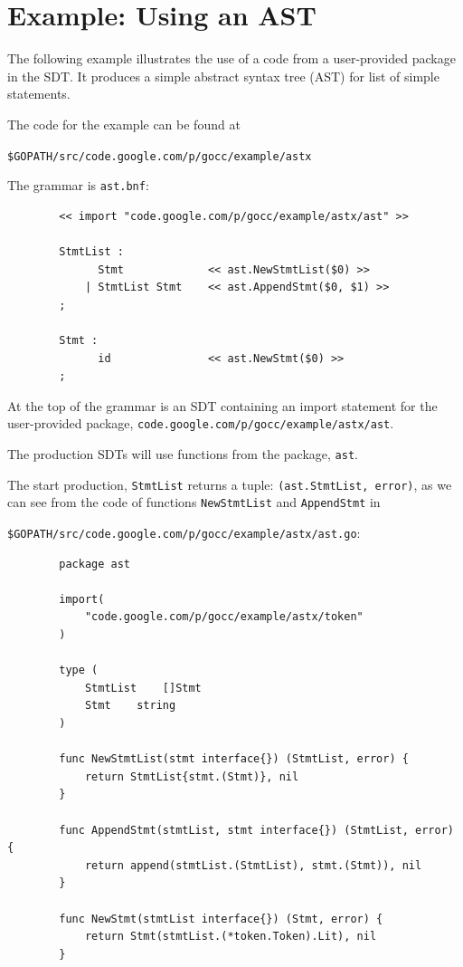 \documentclass[12pt]{article}
\begin{document}
\section{Example: Using an AST} \label{sec:example ast}
	The following example illustrates the use of a code from a user-provided package in the SDT. It produces a simple abstract syntax tree (AST) for list of simple statements. 

	The code for the example can be found at

	\verb|$GOPATH/src/code.google.com/p/gocc/example/astx|

	The grammar is \verb|ast.bnf|:

	\begin{verbatim}
		<< import "code.google.com/p/gocc/example/astx/ast" >>

		StmtList : 
		      Stmt             << ast.NewStmtList($0) >>
		    | StmtList Stmt    << ast.AppendStmt($0, $1) >>
		;

		Stmt : 
		      id               << ast.NewStmt($0) >>
		;
	\end{verbatim}

	At the top of the grammar is an SDT containing an import statement for the user-provided package, 
	\verb|code.google.com/p/gocc/example/astx/ast|.

	The production SDTs will use functions from the package, \verb|ast|.

	The start production, \verb"StmtList" returns a tuple: \verb|(ast.StmtList, error)|, as we can see from the code of functions 
	\verb|NewStmtList| and \verb|AppendStmt| in 

	\verb|$GOPATH/src/code.google.com/p/gocc/example/astx/ast.go|:

	\begin{verbatim}
		package ast

		import(
		    "code.google.com/p/gocc/example/astx/token"
		)

		type (
		    StmtList	[]Stmt
		    Stmt 	string
		)

		func NewStmtList(stmt interface{}) (StmtList, error) {
		    return StmtList{stmt.(Stmt)}, nil
		}

		func AppendStmt(stmtList, stmt interface{}) (StmtList, error) {
		    return append(stmtList.(StmtList), stmt.(Stmt)), nil
		}	

		func NewStmt(stmtList interface{}) (Stmt, error) {
		    return Stmt(stmtList.(*token.Token).Lit), nil
		}
	\end{verbatim}
\end{document}
